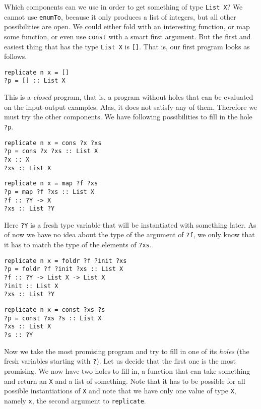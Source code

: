 Which components can we use in order to get something of type \lstinline?List X?? We cannot use \lstinline?enumTo?, because it only produces a list of integers, but all other possibilities are open. We could either fold  with an interesting function, or map some function, or even use \lstinline?const? with a smart first argument. But the first and easiest thing that has the type \lstinline?List X? is \lstinline?[]?. That is, our first program looks as follows.
\begin{lstlisting}[style=plain]
replicate n x = []
?p = [] :: List X
\end{lstlisting}
This is a \emph{closed} program, that is, a program without holes that can be evaluated on the input-output examples. Alas, it does not satisfy any of them. Therefore we must try the other components. We have following possibilities to fill in the hole \lstinline!?p!.

\begin{lstlisting}[style=plain]
replicate n x = cons ?x ?xs
?p = cons ?x ?xs :: List X
?x :: X
?xs :: List X
\end{lstlisting}

\begin{lstlisting}[style=plain]
replicate n x = map ?f ?xs
?p = map ?f ?xs :: List X
?f :: ?Y -> X
?xs :: List ?Y
\end{lstlisting}
Here \lstinline!?Y! is a fresh type variable that will be instantiated with something later. As of now we have no idea about the type of the argument of \lstinline!?f!, we only know that it has to match the type of the elements of \lstinline!?xs!.

\begin{lstlisting}[style=plain]
replicate n x = foldr ?f ?init ?xs
?p = foldr ?f ?init ?xs :: List X
?f :: ?Y -> List X -> List X
?init :: List X
?xs :: List ?Y
\end{lstlisting}

\begin{lstlisting}[style=plain]
replicate n x = const ?xs ?s
?p = const ?xs ?s :: List X
?xs :: List X
?s :: ?Y
\end{lstlisting}

Now we take the most promising program and try to fill in one of its \emph{holes} (the fresh variables starting with \lstinline!?!).
Let us decide that the first one is the most promising. We now have two holes to fill in, a function that can take something and return an \lstinline?X? and a list of something. Note that it has to be possible for all possible instantiations of \lstinline?X? and note that we have only one value of type \lstinline?X?, namely \lstinline?x?, the second argument to \lstinline?replicate?.

